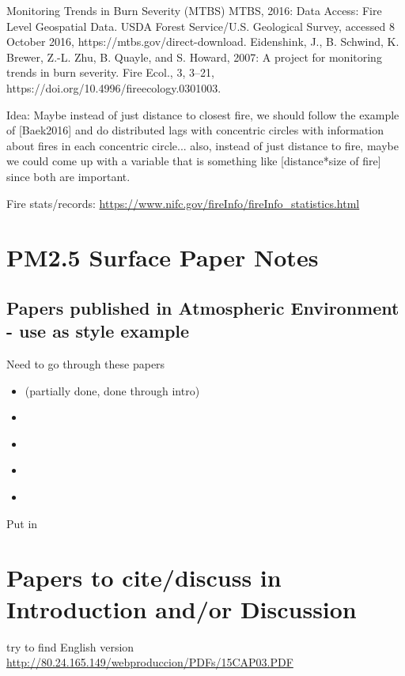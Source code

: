 Monitoring Trends in Burn Severity (MTBS) MTBS, 2016: Data Access: Fire Level Geospatial Data. USDA Forest Service/U.S. Geological Survey, accessed 8 October 2016, https://mtbs.gov/direct-download. 
Eidenshink, J., B. Schwind, K. Brewer, Z.-L. Zhu, B. Quayle, and S. Howard, 2007: A project for monitoring trends in burn severity. Fire Ecol., 3, 3–21, https://doi.org/10.4996/fireecology.0301003. 

Idea: Maybe instead of just distance to closest fire, we should follow the example of [Baek2016] and do distributed lags with concentric circles with information about fires in each concentric circle... also, instead of just distance to fire, maybe we could come up with a variable that is something like [distance*size of fire] since both are important.

Fire stats/records: \url{https://www.nifc.gov/fireInfo/fireInfo_statistics.html}

\section{PM2.5 Surface Paper Notes}

\subsection{Papers published in Atmospheric Environment - use as style example}

Need to go through these papers
\begin{itemize}
\item \cite{BrokampExposure2017} (partially done, done through intro)
\item \cite{Sampson2013}
\item \cite{Anyenda2016}
\item \cite{Torvela2014}
\item \cite{Whiteman2014}
\end{itemize}

Put in \cite{BrokampExposure2017,larsen_impacts_2017}

\section{Papers to cite/discuss in Introduction and/or Discussion}

\cite{westerling_increasing_2016,WesterlingCorrection2016}

try to find English version \url{http://80.24.165.149/webproduccion/PDFs/15CAP03.PDF}

